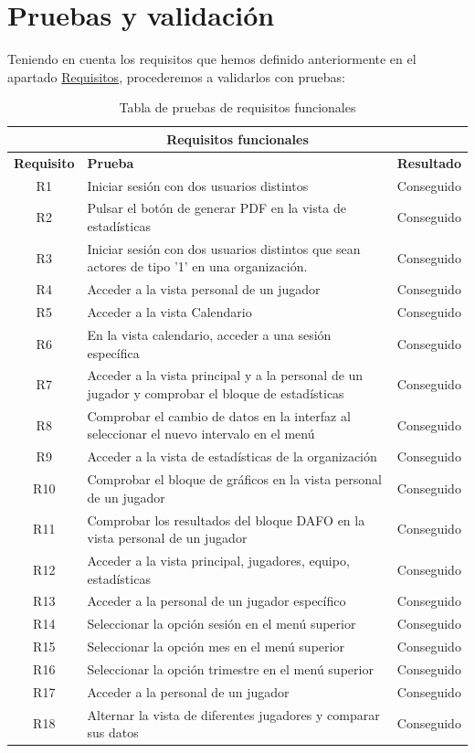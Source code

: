\section{Pruebas y validación}
Teniendo en cuenta los requisitos que hemos definido anteriormente en el apartado \hyperref[subsec:requisitos]{Requisitos}, procederemos a validarlos con pruebas:

\begin{table}[H]
\centering
\begin{tabularx}{\textwidth}{|c|X|c|}
\hline
\multicolumn{3}{|c|}{\textbf{Requisitos funcionales}} \\ \hline
\textbf{Requisito} & \textbf{Prueba} & \textbf{Resultado} \\ \hline
R1 & Iniciar sesión con dos usuarios distintos & Conseguido \\ \hline
R2 & Pulsar el botón de generar PDF en la vista de estadísticas & Conseguido \\ \hline
R3 & Iniciar sesión con dos usuarios distintos que sean actores de tipo '1' en una organización. & Conseguido \\ \hline
R4 & Acceder a la vista personal de un jugador & Conseguido \\ \hline
R5 & Acceder a la vista Calendario & Conseguido \\ \hline
R6 & En la vista calendario, acceder a una sesión específica & Conseguido \\ \hline
R7 & Acceder a la vista principal y a la personal de un jugador y comprobar el bloque de estadísticas & Conseguido \\ \hline
R8 & Comprobar el cambio de datos en la interfaz al seleccionar el nuevo intervalo en el menú & Conseguido \\ \hline
R9 & Acceder a la vista de estadísticas de la organización & Conseguido \\ \hline
R10 & Comprobar el bloque de gráficos en la vista personal de un jugador & Conseguido \\ \hline
R11 & Comprobar los resultados del bloque DAFO en la vista personal de un jugador & Conseguido \\ \hline
R12 & Acceder a la vista principal, jugadores, equipo, estadísticas & Conseguido \\ \hline
R13 & Acceder a la personal de un jugador específico & Conseguido \\ \hline
R14 & Seleccionar la opción sesión en el menú superior & Conseguido \\ \hline
R15 & Seleccionar la opción mes en el menú superior & Conseguido \\ \hline
R16 & Seleccionar la opción trimestre en el menú superior & Conseguido \\ \hline
R17 & Acceder a la personal de un jugador & Conseguido \\ \hline
R18 & Alternar la vista de diferentes jugadores y comparar sus datos & Conseguido \\ \hline
\end{tabularx}
\caption{Tabla de pruebas de requisitos funcionales} \label{tab:pruebas_func}
\end{table}

